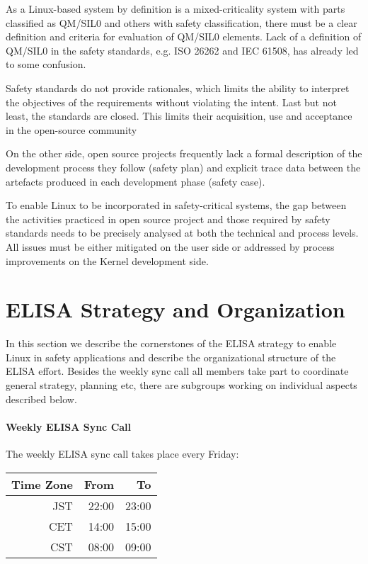 \documentclass[12pt]{ElisaPaper}
\begin{document}
As a Linux-based system by definition is a mixed-criticality system with parts classified as QM/SIL0 and others with safety classification, there must be a clear definition and criteria for evaluation of QM/SIL0 elements.
Lack of a definition of QM/SIL0 in the safety standards, e.g. ISO 26262 and IEC 61508, has already led to some confusion.

Safety standards do not provide rationales, which limits the ability to interpret the objectives of the requirements without violating the intent.
Last but not least, the standards are closed.
This limits their acquisition, use and acceptance in the open-source community

On the other side, open source projects frequently lack a formal description of the development process they follow (safety plan) and explicit trace data between the artefacts produced in each development phase (safety case).

To enable Linux to be incorporated in safety-critical systems, the gap between the activities practiced in open source project and those required by safety standards needs to be precisely analysed at both the technical and process levels.
All issues must be either mitigated on the user side or addressed by process improvements on the Kernel development side.

\section{ELISA Strategy and Organization}
In this section we describe the cornerstones of the ELISA strategy to enable Linux in safety applications and describe the organizational structure of the ELISA effort.
Besides the weekly sync call all members take part to coordinate general strategy, planning etc, there are subgroups working on individual aspects described below.
\paragraph{Weekly ELISA Sync Call}
The weekly ELISA sync call takes place every Friday:
\begin{center}
	\begin{tabular}{rrr}
		\toprule
		Time Zone & From & To\\
		\midrule
		JST & 22:00 & 23:00 \\
		CET	& 14:00 & 15:00 \\
		CST & 08:00 & 09:00 \\
		\bottomrule
	\end{tabular} 
\end{center}
\end{document}
